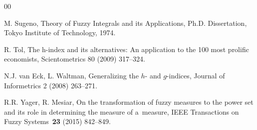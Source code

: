 \documentclass[preprint,11pt]{elsarticle}
\theoremstyle{definition}
\begin{document}
\begin{thebibliography}{00}






 M. Sugeno, Theory of Fuzzy Integrals and its Applications, Ph.D. Dissertation, Tokyo Institute of Technology, 1974.

 R. Tol, The h-index and its alternatives: An application to the 100 most prolific economists, Scientometrics 80 (2009) 317--324.


 N.J. van Eck, L. Waltman, Generalizing the $h$- and $g$-indices, Journal of Informetrics 2 (2008) 263--271.


R.R. Yager, R. Mesiar, On the transformation of fuzzy measures
to the power set and its role in determining
the measure of a~measure, IEEE Transactions on Fuzzy Systems~\textbf{23} (2015) 842--849.


\end{thebibliography}
\end{document}
